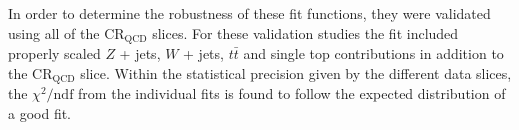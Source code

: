 In order to determine the robustness of these fit functions, they were validated
using all of the $\text{CR}_{\text{QCD}}$ slices.  For these validation studies
the fit included properly scaled $Z$ + jets, $W$ + jets, $t\bar{t}$ and single
top contributions in addition to the $\text{CR}_{\text{QCD}}$ slice. Within the
statistical precision given by the different data slices, the $\chi^{2}/\text{ndf}$
from the individual fits is found to follow the expected distribution of a good
fit.
